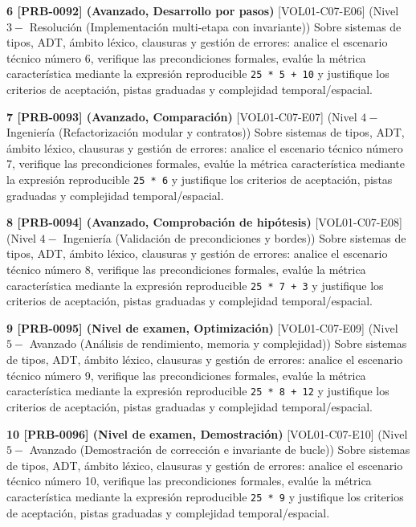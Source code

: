 \documentclass{book}
\begin{document}
\begin{tcolorbox}[title={Ejercicios}, studiumworked, breakable]
\noindent\textbf{6 [PRB-0092] (Avanzado, Desarrollo por pasos)}
[VOL01-C07-E06] (Nivel \(3 -\) Resolución (Implementación multi-etapa con invariante)) Sobre sistemas de tipos, ADT, ámbito léxico, clausuras y gestión de errores: analice el escenario técnico número 6, verifique las precondiciones formales, evalúe la métrica característica mediante la expresión reproducible \texttt{25 * 5 + 10} y justifique los criterios de aceptación, pistas graduadas y complejidad temporal/espacial.

\noindent\textbf{7 [PRB-0093] (Avanzado, Comparación)}
[VOL01-C07-E07] (Nivel \(4 -\) Ingeniería (Refactorización modular y contratos)) Sobre sistemas de tipos, ADT, ámbito léxico, clausuras y gestión de errores: analice el escenario técnico número 7, verifique las precondiciones formales, evalúe la métrica característica mediante la expresión reproducible \texttt{25 * 6} y justifique los criterios de aceptación, pistas graduadas y complejidad temporal/espacial.

\noindent\textbf{8 [PRB-0094] (Avanzado, Comprobación de hipótesis)}
[VOL01-C07-E08] (Nivel \(4 -\) Ingeniería (Validación de precondiciones y bordes)) Sobre sistemas de tipos, ADT, ámbito léxico, clausuras y gestión de errores: analice el escenario técnico número 8, verifique las precondiciones formales, evalúe la métrica característica mediante la expresión reproducible \texttt{25 * 7 + 3} y justifique los criterios de aceptación, pistas graduadas y complejidad temporal/espacial.

\noindent\textbf{9 [PRB-0095] (Nivel de examen, Optimización)}
[VOL01-C07-E09] (Nivel \(5 -\) Avanzado (Análisis de rendimiento, memoria y complejidad)) Sobre sistemas de tipos, ADT, ámbito léxico, clausuras y gestión de errores: analice el escenario técnico número 9, verifique las precondiciones formales, evalúe la métrica característica mediante la expresión reproducible \texttt{25 * 8 + 12} y justifique los criterios de aceptación, pistas graduadas y complejidad temporal/espacial.

\noindent\textbf{10 [PRB-0096] (Nivel de examen, Demostración)}
[VOL01-C07-E10] (Nivel \(5 -\) Avanzado (Demostración de corrección e invariante de bucle)) Sobre sistemas de tipos, ADT, ámbito léxico, clausuras y gestión de errores: analice el escenario técnico número 10, verifique las precondiciones formales, evalúe la métrica característica mediante la expresión reproducible \texttt{25 * 9} y justifique los criterios de aceptación, pistas graduadas y complejidad temporal/espacial.


\end{tcolorbox}
\end{document}
